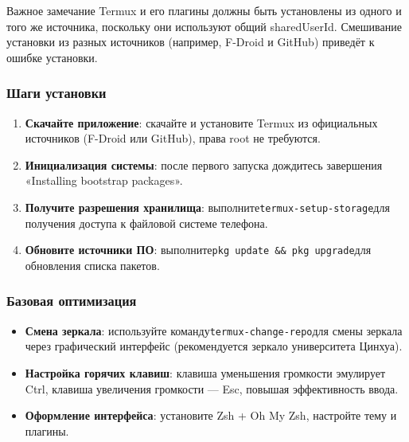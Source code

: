 \begin{tcbwarn}{Важное замечание}
Termux и его плагины должны быть установлены из одного и того же источника, поскольку они используют общий sharedUserId. Смешивание установки из разных источников (например, F-Droid и GitHub) приведёт к ошибке установки.

\end{tcbwarn}


\subsubsection*{Шаги установки}

\begin{enumerate}
  \item \textbf{Скачайте приложение}: скачайте и установите Termux из официальных источников (F-Droid или GitHub), права root не требуются.
  \item \textbf{Инициализация системы}: после первого запуска дождитесь завершения «Installing bootstrap packages».
  \item \textbf{Получите разрешения хранилища}: выполните\texttt{termux-\allowbreak setup-\allowbreak storage}для получения доступа к файловой системе телефона.
  \item \textbf{Обновите источники ПО}: выполните\texttt{pkg update \&\& pkg upgrade}для обновления списка пакетов.
\end{enumerate}

\subsubsection*{Базовая оптимизация}

\begin{itemize}
  \item \textbf{Смена зеркала}: используйте команду\texttt{termux-\allowbreak change-\allowbreak repo}для смены зеркала через графический интерфейс (рекомендуется зеркало университета Цинхуа).
  \item \textbf{Настройка горячих клавиш}: клавиша уменьшения громкости эмулирует Ctrl, клавиша увеличения громкости — Esc, повышая эффективность ввода.
  \item \textbf{Оформление интерфейса}: установите Zsh + Oh My Zsh, настройте тему и плагины.
\end{itemize}


